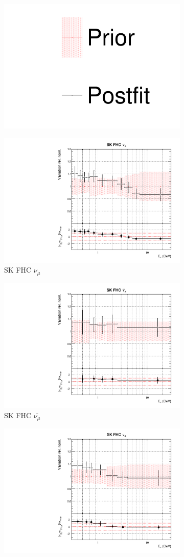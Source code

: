 \begin{figure}[!htbp]
\centering
\begin{subfigure}{0.8\textwidth}
  \centering
  \includegraphics[width=0.24\linewidth]{figs/dat_leg}
\end{subfigure}
\begin{subfigure}{0.45\textwidth}
  \centering
  \includegraphics[width=0.75\linewidth]{figs/datflux8}
  \caption{SK FHC $\nu_{\mu}$}
\end{subfigure}
\begin{subfigure}{0.45\textwidth}
  \centering
  \includegraphics[width=0.75\linewidth]{figs/datflux9}
  \caption{SK FHC $\bar{\nu_{\mu}}$}
\end{subfigure}
\begin{subfigure}{0.45\textwidth}
  \centering
  \includegraphics[width=0.75\linewidth]{figs/datflux10}

\end{subfigure}
\end{figure}
